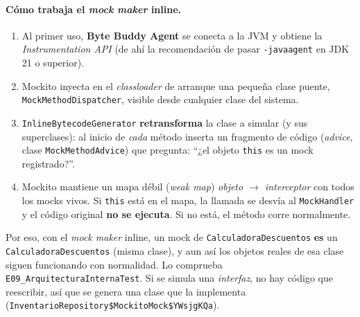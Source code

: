 \documentclass[11pt,a4paper,oneside]{report}
\newcommand{\code}[1]{\texttt{#1}}
\begin{document}
\paragraph{Cómo trabaja el \emph{mock maker} inline.}
\begin{enumerate}
  \item Al primer uso, \textbf{Byte Buddy Agent} se conecta a la JVM y obtiene la \emph{Instrumentation API} (de ahí la recomendación de pasar \code{-javaagent} en JDK 21 o superior).
  \item Mockito inyecta en el \emph{classloader} de arranque una pequeña clase puente, \code{MockMethodDispatcher}, visible desde cualquier clase del sistema.
  \item \code{InlineBytecodeGenerator} \textbf{retransforma} la clase a simular (y sus superclases): al inicio de \emph{cada} método inserta un fragmento de código (\emph{advice}, clase \code{MockMethodAdvice}) que pregunta: ``¿el objeto \code{this} es un mock registrado?''.
  \item Mockito mantiene un mapa débil (\emph{weak map}) \emph{objeto $\rightarrow$ interceptor} con todos los mocks vivos. Si \code{this} está en el mapa, la llamada se desvía al \code{MockHandler} y el código original \textbf{no se ejecuta}. Si no está, el método corre normalmente.
\end{enumerate}
Por eso, con el \emph{mock maker} inline, un mock de \code{CalculadoraDescuentos} \textbf{es} un \code{CalculadoraDescuentos} (misma clase), y aun así los objetos reales de esa clase siguen funcionando con normalidad. Lo comprueba \code{E09\_ArquitecturaInternaTest}. Si se simula una \emph{interfaz}, no hay código que reescribir, así que se genera una clase que la implementa (\code{InventarioRepository\$MockitoMock\$YWsjgKQa}).
\end{document}

